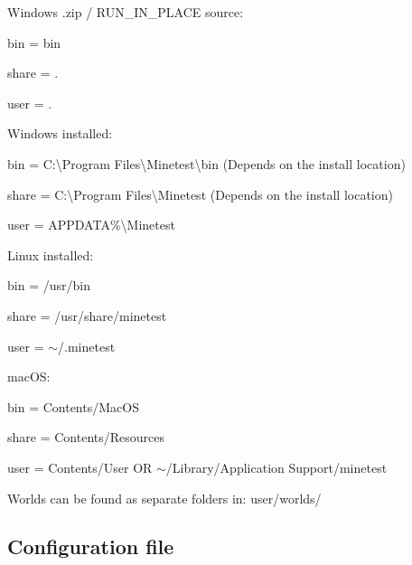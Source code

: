 \begin{DoxyItemize}
\item Windows .zip / R\+U\+N\+\_\+\+I\+N\+\_\+\+P\+L\+A\+CE source\+:
\begin{DoxyItemize}
\item {\ttfamily bin} = {\ttfamily bin}
\item {\ttfamily share} = {\ttfamily .}
\item {\ttfamily user} = {\ttfamily .}
\end{DoxyItemize}
\item Windows installed\+:
\begin{DoxyItemize}
\item {\ttfamily bin} = {\ttfamily C\+:\textbackslash{}Program Files\textbackslash{}Minetest\textbackslash{}bin (Depends on the install location)}
\item {\ttfamily share} = {\ttfamily C\+:\textbackslash{}Program Files\textbackslash{}Minetest (Depends on the install location)}
\item {\ttfamily user} = {\ttfamily A\+P\+P\+D\+A\+TA\%\textbackslash{}Minetest}
\end{DoxyItemize}
\item Linux installed\+:
\begin{DoxyItemize}
\item {\ttfamily bin} = {\ttfamily /usr/bin}
\item {\ttfamily share} = {\ttfamily /usr/share/minetest}
\item {\ttfamily user} = {\ttfamily $\sim$/.minetest}
\end{DoxyItemize}
\item mac\+OS\+:
\begin{DoxyItemize}
\item {\ttfamily bin} = {\ttfamily Contents/\+Mac\+OS}
\item {\ttfamily share} = {\ttfamily Contents/\+Resources}
\item {\ttfamily user} = {\ttfamily Contents/\+User OR $\sim$/\+Library/\+Application Support/minetest}
\end{DoxyItemize}
\end{DoxyItemize}

Worlds can be found as separate folders in\+: {\ttfamily user/worlds/}

\subsection*{Configuration file }


